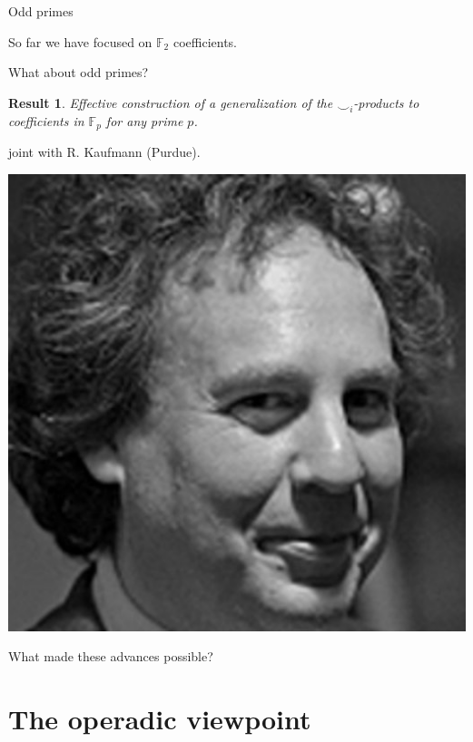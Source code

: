 \documentclass[10pt,t]{beamer} %
\newtheorem{result}{Result}
\begin{document}
\begin{frame}{Odd primes}
	
	So far we have focused on $\mathbb{F}_2$ coefficients.
	
	\vskip 5pt
	
	
	What about odd primes?
	
	\pause
	\vskip 5pt
	
	
	\begin{result}
		Effective construction of a generalization of the $\smallsmile_i$-products to coefficients in $\mathbb F_p$ for any prime $p$.
	\end{result}
	joint with R. Kaufmann (Purdue).
	
	\begin{center}
		\includegraphics[scale=.1]{kaufmann}
	\end{center}
	
	\pause
	\vskip 9pt
	
	\textcolor{pblue}{What made these advances possible?}
	
\end{frame}

\section{The operadic viewpoint}
\end{document}
